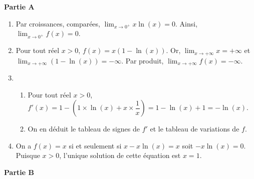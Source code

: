 \documentclass[11pt,fleqn, openany]{book} %
\begin{document}
\begin{solution}\hspace{0pt}

\textbf{Partie A}

\begin{enumerate}
 \item Par croissances, comparées, $\displaystyle\lim_{x \to 0^+} x\ln(x)=0$. Ainsi, $\displaystyle\lim_{x\to 0^+}f(x)=0$.
 \item Pour tout réel $x>0$, $f(x)=x(1-\ln(x))$. Or, $\displaystyle\lim_{x\to+\infty}x=+\infty$ et $\displaystyle\lim_{x\to +\infty}(1-\ln(x))=-\infty$. Par produit, $\displaystyle\lim_{x\to +\infty}f(x)=-\infty$.
 \item \begin{enumerate}
 \item Pour tout réel $x>0$, $f'(x)= 1-\left(1\times \ln(x)+x \times \dfrac{1}{x}\right)=1-\ln(x)+1=-\ln(x)$.
 \item On en déduit le tableau de signes de $f'$ et le tableau de variations de $f$.
 
 \begin{center}\end{center}

 \end{enumerate}
\item On a $f(x)=x$ si et seulement si $x-x\ln(x)=x$ soit $-x\ln(x)=0$. Puisque $x>0$, l'unique solution de cette équation est $x=1$.
\end{enumerate}

\textbf{Partie B}


\end{solution}
\end{document}
